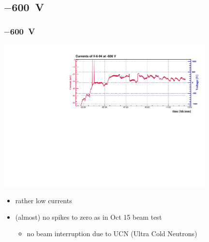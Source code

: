 \documentclass[9pt]{beamer}
\begin{document}
\subsection{$-$\SI{600}{V}}
\begin{frame}
	\frametitle{$-$\SI{600}{V}}
	\vspace*{-15pt}
	\begin{center}
		\includegraphics[angle=270, width=11cm]{II-6-94_-600}
	\end{center}
	\begin{itemize}
		\item rather low currents
		\item (almost) no spikes to zero as in Oct 15 beam test
		\begin{itemize}
			\item no beam interruption due to UCN (Ultra Cold Neutrons)
		\end{itemize}
	\end{itemize}
\end{frame}
\end{document}
